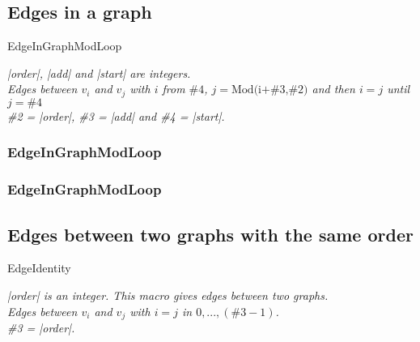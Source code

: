 \newpage
\subsection{Edges in a graph  }
\begin{NewMacroBox}{EdgeInGraphModLoop}{}

\medskip
\emph{ |order|, |add| and |start| are integers.\\
Edges between $v_i$ and $v_j$ with $i$ from $\#4$, $j=\text{Mod(i+\#3,\#2)}$ and then $i=j$ until $j=\#4$\\
\#2 = |order|,  \#3 = |add| and \#4 = |start|.}
\end{NewMacroBox}

\subsubsection{EdgeInGraphModLoop}
\begin{center}
\begin{tkzexample}
\end{tkzexample}
\end{center}

\subsubsection{EdgeInGraphModLoop}
\begin{center}
\begin{tkzexample}
\end{tkzexample}
\end{center}


\newpage
\subsection{Edges between two graphs with the same order }

\begin{NewMacroBox}{EdgeIdentity}{}

\medskip
\emph{|order| is an integer. This macro gives edges between two graphs.\\
Edges between $v_i$ and $v_j$ with $i=j$ in $0,...,(\text{\#3}-1)$.\\
\#3 = |order|.\\}
\end{NewMacroBox}

